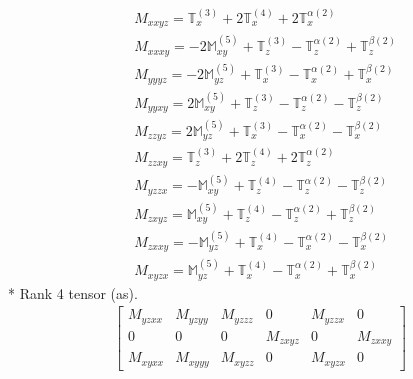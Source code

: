 \documentclass[fleqn,8pt,landscape]{jsarticle}
\begin{document}
\begin{align*}
& M_{xxyz} = \mathbb{T}_{x}^{(3)} + 2 \mathbb{T}_{x}^{(4)} + 2 \mathbb{T}_{x}^{\alpha(2)} \\
& M_{xxxy} = - 2 \mathbb{M}_{xy}^{(5)} + \mathbb{T}_{z}^{(3)} - \mathbb{T}_{z}^{\alpha(2)} + \mathbb{T}_{z}^{\beta(2)} \\
& M_{yyyz} = - 2 \mathbb{M}_{yz}^{(5)} + \mathbb{T}_{x}^{(3)} - \mathbb{T}_{x}^{\alpha(2)} + \mathbb{T}_{x}^{\beta(2)} \\
& M_{yyxy} = 2 \mathbb{M}_{xy}^{(5)} + \mathbb{T}_{z}^{(3)} - \mathbb{T}_{z}^{\alpha(2)} - \mathbb{T}_{z}^{\beta(2)} \\
& M_{zzyz} = 2 \mathbb{M}_{yz}^{(5)} + \mathbb{T}_{x}^{(3)} - \mathbb{T}_{x}^{\alpha(2)} - \mathbb{T}_{x}^{\beta(2)} \\
& M_{zzxy} = \mathbb{T}_{z}^{(3)} + 2 \mathbb{T}_{z}^{(4)} + 2 \mathbb{T}_{z}^{\alpha(2)} \\
& M_{yzzx} = - \mathbb{M}_{xy}^{(5)} + \mathbb{T}_{z}^{(4)} - \mathbb{T}_{z}^{\alpha(2)} - \mathbb{T}_{z}^{\beta(2)} \\
& M_{zxyz} = \mathbb{M}_{xy}^{(5)} + \mathbb{T}_{z}^{(4)} - \mathbb{T}_{z}^{\alpha(2)} + \mathbb{T}_{z}^{\beta(2)} \\
& M_{zxxy} = - \mathbb{M}_{yz}^{(5)} + \mathbb{T}_{x}^{(4)} - \mathbb{T}_{x}^{\alpha(2)} - \mathbb{T}_{x}^{\beta(2)} \\
& M_{xyzx} = \mathbb{M}_{yz}^{(5)} + \mathbb{T}_{x}^{(4)} - \mathbb{T}_{x}^{\alpha(2)} + \mathbb{T}_{x}^{\beta(2)}
\end{align*}
* Rank 4 tensor (as).
\begin{align*}
\begin{bmatrix} M_{yzxx} & M_{yzyy} & M_{yzzz} & 0 & M_{yzzx} & 0 \\ 0 & 0 & 0 & M_{zxyz} & 0 & M_{zxxy} \\ M_{xyxx} & M_{xyyy} & M_{xyzz} & 0 & M_{xyzx} & 0 \end{bmatrix}
\end{align*}
\end{document}
